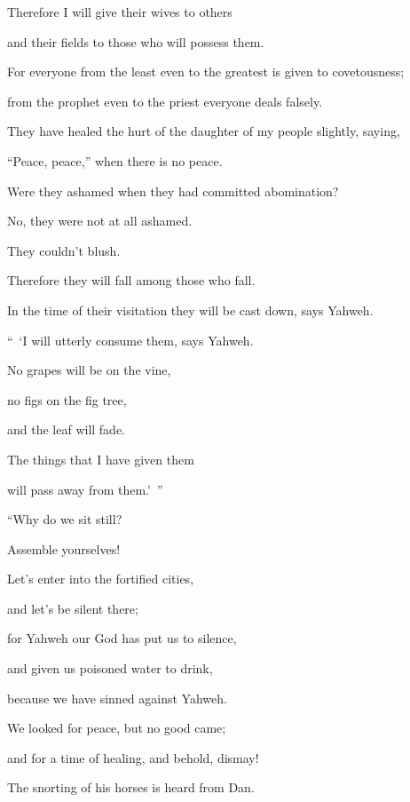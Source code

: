 {\par }{\Q {}Therefore I will give their wives to others
\par }{\QB and their fields to those who will possess them.
\par }{\Q For everyone from the least even to the greatest is given to covetousness;
\par }{\QB from the prophet even to the priest everyone deals falsely.
\par }{\Q {}They have healed the hurt of the daughter of my people slightly, saying,
\par }{\QB “Peace, peace,” when there is no peace.
\par }{\Q {}Were they ashamed when they had committed abomination?
\par }{\QB No, they were not at all ashamed.
\par }{\QB They couldn’t blush.
\par }{\Q Therefore they will fall among those who fall.
\par }{\QB In the time of their visitation they will be cast down, says Yahweh.
\par }{\BB \par }{\Q {}“ ‘I will utterly consume them, says Yahweh.
\par }{\QB No grapes will be on the vine,
\par }{\QB no figs on the fig tree,
\par }{\QB and the leaf will fade.
\par }{\Q The things that I have given them
\par }{\QB will pass away from them.’ ”
\par }{\BB \par }{\Q {}“Why do we sit still?
\par }{\QB Assemble yourselves!
\par }{\QB Let’s enter into the fortified cities,
\par }{\QB and let’s be silent there;
\par }{\Q for Yahweh our God has put us to silence,
\par }{\QB and given us poisoned water to drink,
\par }{\QB because we have sinned against Yahweh.
\par }{\Q {}We looked for peace, but no good came;
\par }{\QB and for a time of healing, and behold, dismay!
\par }{\Q {}The snorting of his horses is heard from Dan.
}
